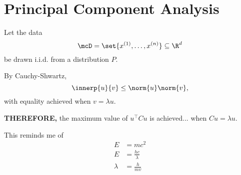 \chapter{Principal Component Analysis} \label{chp:pca}
Let the data \[
    \mcD = \set{x^{(1)}, \dots, x^{(n)}} \subseteq \R^d
\] be drawn i.i.d. from a distribution $P$.

By Cauchy-Shwartz, \[
    \innerp{u}{v} \le \norm{u} \norm{v},
\] with equality achieved when $v = \lambda u$.

\textbf{THEREFORE,} the maximum value of $u^\top C u$ is achieved...
when $C u = \lambda u$.

This reminds me of
\begin{align*}
    E &= mc^2 \\
    E &= \frac{hc}{\lambda} \\
    \lambda &= \frac{h}{mv}
\end{align*}
